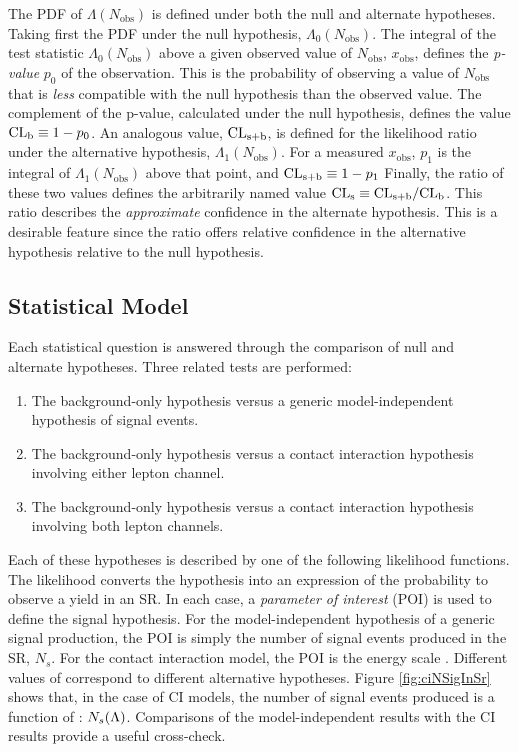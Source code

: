 The PDF of $\Lambda(N_\text{obs})$ is defined under both the null and alternate hypotheses.
Taking first the PDF under the null hypothesis, $\Lambda_0(N_\text{obs})$.
The integral of the test statistic $\Lambda_0(N_\text{obs})$ above a given observed value of $N_\text{obs}$, $x_\text{obs}$, defines the \emph{p-value} $p_0$ of the observation.
This is the probability of observing a value of $N_\text{obs}$ that is \emph{less} compatible with the null hypothesis than the observed value.
The complement of the p-value, calculated under the null hypothesis, defines the value $\text{CL}_\text{b}\equiv1-p_0$.
An analogous value, $\text{CL}_\text{s+b}$, is defined for the likelihood ratio under the alternative hypothesis, $\Lambda_1(N_\text{obs})$.
For a measured $x_\text{obs}$, $p_1$ is the integral of $\Lambda_1(N_\text{obs})$ above that point, and $\text{CL}_\text{s+b}\equiv1-p_1$
Finally, the ratio of these two values defines the arbitrarily named value $\text{CL}_\text{s}\equiv \text{CL}_\text{s+b}/\text{CL}_\text{b}$.
This ratio describes the \emph{approximate} confidence in the alternate hypothesis.\cite{read}
This is a desirable feature since the \cls ratio offers relative confidence in the alternative hypothesis relative to the null hypothesis.


\subsection{Statistical Model}\label{sec:ciStatModel}

Each statistical question is answered through the comparison of null and alternate hypotheses.
Three related tests are performed:
\begin{enumerate}
    \item The background-only hypothesis versus a generic model-independent hypothesis of signal events.
    \item The background-only hypothesis versus a contact interaction hypothesis involving either lepton channel.
    \item The background-only hypothesis versus a contact interaction hypothesis involving both lepton channels.
\end{enumerate}
Each of these hypotheses is described by one of the following likelihood functions.
The likelihood converts the hypothesis into an expression of the probability to observe a yield in an SR.
In each case, a \emph{parameter of interest} (POI) is used to define the signal hypothesis.
For the model-independent hypothesis of a generic signal production, the POI is simply the number of signal events produced in the SR, $N_s$.
For the contact interaction model, the POI is the energy scale \lam. Different values of \lam correspond to different alternative hypotheses.
Figure \ref{fig:ciNSigInSr} shows that, in the case of CI models, the number of signal events produced is a function of \lam: $N_s(\Lambda)$.
Comparisons of the model-independent results with the CI results provide a useful cross-check.

